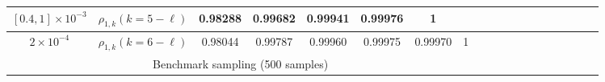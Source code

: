 \begin{table}[ht]
{\begin{tabular}{|c|c|c|c|c|c|c|c|c|c|c|c|c|c|c|c|c|c|c|}
\hline
\cline{2-7}	
\multirow{1}{*}{$[0.4, 1]\times 10^{-3}$}&\multicolumn{1}{|c|}{$\rho_{1,k} (k=5-\ell)$}&0.98288&0.99682&0.99941  &0.99976&1 &\\
\hline
\cline{2-8}	
\multirow{1}{*}{$2\times 10^{-4}$}&\multicolumn{1}{|c|}{$\rho_{1,k} (k=6-\ell)$}&0.98044&0.99787&0.99960&0.99975&0.99970   &1\\
\hline
\multicolumn{8}{|c|}{Benchmark sampling (500 samples)} \\
\hline

\end{tabular}}
\end{table}
